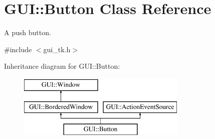 \hypertarget{classGUI_1_1Button}{\section{G\-U\-I\-:\-:Button Class Reference}
\label{classGUI_1_1Button}
}


A push button.  




{\ttfamily \#include $<$gui\-\_\-tk.\-h$>$}

Inheritance diagram for G\-U\-I\-:\-:Button\-:\begin{figure}[H]
\begin{center}
\leavevmode
\includegraphics[height=3.000000cm]{classGUI_1_1Button}
\end{center}
\end{figure}
